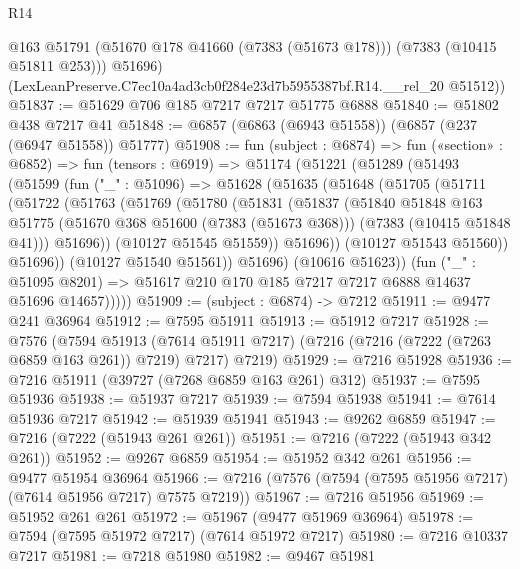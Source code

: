 \begin{lexlean}{R14}
\begin{coremodule}
          @163
          @51791
          (@51670 @178 @41660 (@7383 (@51673 @178)))
          (@7383 (@10415 @51811 @253)))
        @51696)
      (LexLeanPreserve.C7ec10a4ad3cb0f284e23d7b5955387bf.R14.__rel_20 @51512))
@51837 := @51629 @706 @185 @7217 @7217 @51775 @6888
@51840 := @51802 @438 @7217 @41
@51848 := @6857 (@6863 (@6943 @51558)) (@6857 (@237 (@6947 @51558)) @51777)
@51908 := fun (subject : @6874) =>
  fun («section» : @6852) =>
  fun (tensors : @6919) =>
  @51174
    (@51221
      (@51289
        (@51493
          (@51599
            (fun ("_" : @51096) =>
            @51628
              (@51635
                (@51648
                  (@51705
                    (@51711
                      (@51722
                        (@51763
                          (@51769
                            (@51780
                              (@51831
                                (@51837
                                  (@51840
                                    @51848
                                    @163
                                    @51775
                                    (@51670 @368 @51600 (@7383 (@51673 @368)))
                                    (@7383 (@10415 @51848 @41)))
                                  @51696))
                              (@10127 @51545 @51559))
                            @51696))
                        (@10127 @51543 @51560))
                      @51696))
                  (@10127 @51540 @51561))
                @51696)
              (@10616 @51623))
            (fun ("_" : @51095 @8201) =>
            @51617 @210 @170 @185 @7217 @7217 @6888 @14637 @51696 @14657)))))
@51909 := (subject : @6874) -> @7212
@51911 := @9477 @241 @36964
@51912 := @7595 @51911
@51913 := @51912 @7217
@51928 := @7576
    (@7594
      @51913
      (@7614 @51911 @7217)
      (@7216 (@7216 (@7222 (@7263 @6859 @163 @261)) @7219) @7217)
      @7219)
@51929 := @7216 @51928
@51936 := @7216 @51911 (@39727 (@7268 @6859 @163 @261) @312)
@51937 := @7595 @51936
@51938 := @51937 @7217
@51939 := @7594 @51938
@51941 := @7614 @51936 @7217
@51942 := @51939 @51941
@51943 := @9262 @6859
@51947 := @7216 (@7222 (@51943 @261 @261))
@51951 := @7216 (@7222 (@51943 @342 @261))
@51952 := @9267 @6859
@51954 := @51952 @342 @261
@51956 := @9477 @51954 @36964
@51966 := @7216 (@7576 (@7594 (@7595 @51956 @7217) (@7614 @51956 @7217) @7575 @7219))
@51967 := @7216 @51956
@51969 := @51952 @261 @261
@51972 := @51967 (@9477 @51969 @36964)
@51978 := @7594 (@7595 @51972 @7217) (@7614 @51972 @7217)
@51980 := @7216 @10337 @7217
@51981 := @7218 @51980
@51982 := @9467 @51981

\end{coremodule}
\end{lexlean}
